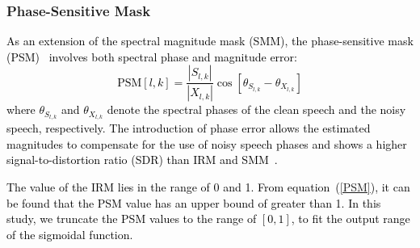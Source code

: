 \documentclass[journal]{IEEEtran}
\begin{document}


\subsubsection{Phase-Sensitive Mask}

\textcolor{black}{As an extension of \textcolor{black}{the spectral magnitude mask (SMM)}, the phase-sensitive mask (PSM)~\cite{psm} involves both spectral phase and magnitude error:
\begin{equation}\label{PSM}
\text{PSM}[l,k]=\frac{|S_{l, k}|}{|X_{l, k}|}\cos[\theta_{{S}_{l,k}} -\theta_{{X}_{l,k}}]
\end{equation}
where $\theta_{{S}_{l,k}}$ and $\theta_{{X}_{l,k}}$ denote the spectral phases of the clean speech and the noisy speech, respectively. The introduction of phase error allows the estimated magnitudes to compensate for the use of noisy speech phases and shows a higher signal-to-distortion ratio (SDR) than IRM and SMM~\cite{psm}.}



\textcolor{black}{The value of the IRM lies in the range of 0 and 1. From equation~(\ref{PSM}), it can be found that the PSM value has an upper bound of greater than 1. In this study, we truncate the PSM values to the range of $[0,1]$, to fit the output range of the sigmoidal function. }
\end{document}

